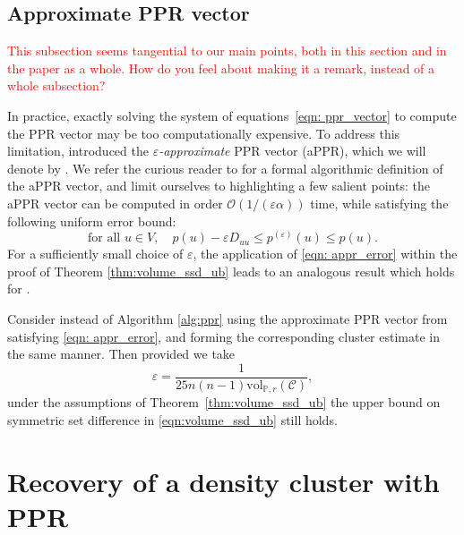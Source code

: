 \documentclass[11pt,twoside]{article}
\newcommand{\1}{\mathbf{1}}
\newcommand{\mc}[1]{\mathcal{#1}}
\newcommand{\Pbb}{\mathbb{P}}
\newcommand{\wh}[1]{\widehat{#1}}
\newcommand{\vol}{\mathrm{vol}}
\begin{document}
\subsection{Approximate PPR vector} 

\textcolor{red}{This subsection seems tangential to our main points, both in this section and in the paper as a whole. How do you feel about making it a remark, instead of a whole subsection?}

In practice, exactly solving the system of equations~\eqref{eqn: ppr_vector} to compute the PPR vector may be too computationally expensive. To address this limitation, \citet{andersen2006} introduced the \emph{$\varepsilon$-approximate} PPR vector (aPPR), which we will denote by . We refer the curious reader to \citet{andersen2006} for a formal algorithmic definition of the aPPR vector, and limit ourselves to highlighting a few salient points: the aPPR vector can be computed in order $\mathcal{O}(1/(\varepsilon\alpha))$ time, while satisfying the following uniform error bound: 
\begin{equation}
\label{eqn: appr_error}
\textrm{for all $u \in V$}, \quad p(u) - \varepsilon D_{uu}\leq
p^{(\varepsilon)}(u) \leq p(u).  
\end{equation}
For a sufficiently small choice of $\varepsilon$, the 
application of \eqref{eqn: appr_error} within the proof of Theorem
\ref{thm:volume_ssd_ub} leads to an analogous result which holds for .

\begin{corollary}
	\label{cor: appr}
	Consider instead of
	Algorithm \ref{alg:ppr} using the approximate PPR vector from
	\citet{andersen2006} satisfying \eqref{eqn: appr_error}, and forming the 
	corresponding cluster estimate \smash{$\wh{C}$} in the same manner.  Then 
	provided we take 
	\begin{equation}
	\label{eqn: appr_parameter}
	\varepsilon = \frac{1}{25 n(n - 1)\vol_{\Pbb,r}(\mc{C})} ,
	\end{equation}
	under the assumptions of Theorem~\ref{thm:volume_ssd_ub} the upper bound on symmetric set difference in \eqref{eqn:volume_ssd_ub} still
	holds.
\end{corollary}

\section{Recovery of a density cluster with PPR}
\label{sec:ppr_density_cluster}
\end{document}
